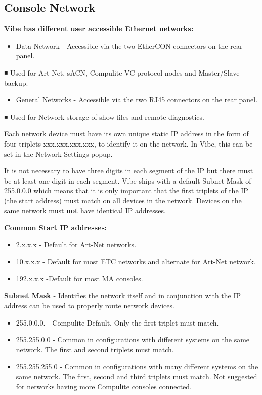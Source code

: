 \documentclass[
]{article}
\providecommand{\tightlist}{%
  \setlength{\itemsep}{0pt}\setlength{\parskip}{0pt}}
\begin{document}
\hypertarget{Console-Network-17.1}{%
\subsection{Console Network}\label{Console-Network-17.1}}

\textbf{Vibe has different user accessible Ethernet networks:}

\begin{itemize}
\tightlist
\item
  Data Network - Accessible via the two EtherCON connectors on the rear panel.
\end{itemize}

◾ Used for Art-Net, sACN, Compulite VC protocol nodes and Master/Slave backup.

\begin{itemize}
\tightlist
\item
  General Networks - Accessible via the two RJ45 connectors on the rear panel.
\end{itemize}

◾ Used for Network storage of show files and remote diagnostics.

Each network device must have its own unique static IP address in the form of four triplets xxx.xxx.xxx.xxx, to identify it on the network. In Vibe, this can be set in the Network Settings popup.

It is not necessary to have three digits in each segment of the IP but there must be at least one digit in each segment. Vibe ships with a default Subnet Mask of 255.0.0.0 which means that it is only important that the first triplets of the IP (the start address) must match on all devices in the network. Devices on the same network must \textbf{not} have identical IP addresses.

\textbf{Common Start IP addresses:}

\begin{itemize}
\item
  2.x.x.x - Default for Art-Net networks.
\item
  10.x.x.x - Default for most ETC networks and alternate for Art-Net network.
\item
  192.x.x.x -Default for most MA consoles.
\end{itemize}

\textbf{Subnet Mask} - Identifies the network itself and in conjunction with the IP address can be used to properly route network devices.

\begin{itemize}
\item
  255.0.0.0. - Compulite Default. Only the first triplet must match.
\item
  255.255.0.0 - Common in configurations with different systems on the same network. The first and second triplets must match.
\item
  255.255.255.0 - Common in configurations with many different systems on the same network. The first, second and third triplets must match. Not suggested for networks having more Compulite consoles connected.
\end{itemize}
\end{document}
